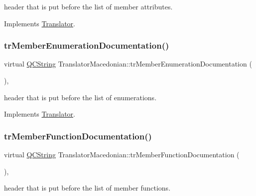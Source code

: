 header that is put before the list of member attributes. 

Implements \mbox{\hyperlink{class_translator}{Translator}}.

\mbox{\label{class_translator_macedonian_ab452abb4c11eabb2c4633126a9501967}} 
\subsubsection{\texorpdfstring{trMemberEnumerationDocumentation()}{trMemberEnumerationDocumentation()}}
{\footnotesize\ttfamily virtual \mbox{\hyperlink{class_q_c_string}{Q\+C\+String}} Translator\+Macedonian\+::tr\+Member\+Enumeration\+Documentation (\begin{DoxyParamCaption}{ }\end{DoxyParamCaption})\hspace{0.3cm}{\ttfamily [inline]}, {\ttfamily [virtual]}}

header that is put before the list of enumerations. 

Implements \mbox{\hyperlink{class_translator}{Translator}}.

\mbox{\label{class_translator_macedonian_a809ac6bc9aa483ba37bde5961157d4a0}} 
\subsubsection{\texorpdfstring{trMemberFunctionDocumentation()}{trMemberFunctionDocumentation()}}
{\footnotesize\ttfamily virtual \mbox{\hyperlink{class_q_c_string}{Q\+C\+String}} Translator\+Macedonian\+::tr\+Member\+Function\+Documentation (\begin{DoxyParamCaption}{ }\end{DoxyParamCaption})\hspace{0.3cm}{\ttfamily [inline]}, {\ttfamily [virtual]}}

header that is put before the list of member functions. 

